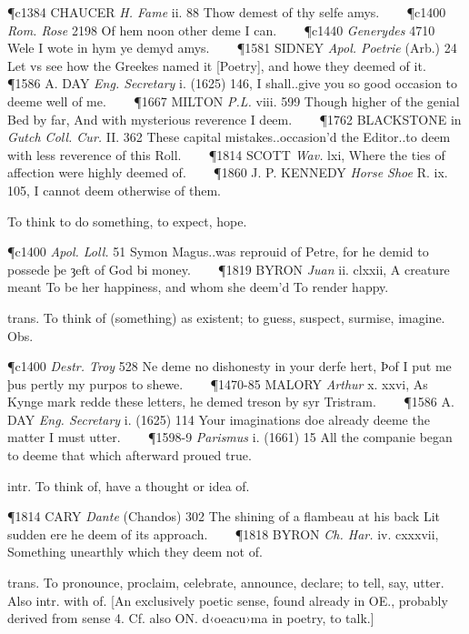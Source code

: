 \begin{description}[wide, labelwidth=!, labelindent=0pt]
\begin{myenumerate}
\P c1384 CHAUCER  \textit{H. Fame} ii. 88 Thow demest of thy selfe amys.    
\P c1400  \textit{Rom. Rose} 2198 Of hem noon other deme I can.    
\P c1440 \textit{Generydes}  4710 Wele I wote in hym ye demyd amys.    
\P 1581 SIDNEY  \textit{Apol. Poetrie} (Arb.) 24 Let vs see how the Greekes named it [Poetry], and howe they deemed of it.    
\P 1586 A. DAY  \textit{Eng. Secretary} i. (1625) 146, I shall..give you so good occasion to deeme well of me.    
\P 1667 MILTON  \textit{P.L.} viii. 599 Though higher of the genial Bed by far, And with mysterious reverence I deem.    
\P 1762 BLACKSTONE in  \textit{Gutch Coll. Cur.} II. 362 These capital mistakes..occasion'd the Editor..to deem with less reverence of this Roll.    
\P 1814 SCOTT  \textit{Wav.} lxi, Where the ties of affection were highly deemed of.    
\P 1860 J. P. KENNEDY  \textit{Horse Shoe} R. ix. 105, I cannot deem otherwise of them.

 To think to do something, to expect, hope.

\P c1400  \textit{Apol. Loll.} 51 Symon Magus..was reprouid of Petre, for he demid to possede þe ȝeft of God bi money.    
\P 1819 BYRON  \textit{Juan} ii. clxxii, A creature meant To be her happiness, and whom she deem'd To render happy.

 trans. To think of (something) as existent; to guess, suspect, surmise, imagine. Obs.

\P c1400  \textit{Destr. Troy} 528 Ne deme no dishonesty in your derfe hert, Þof I put me þus pertly my purpos to shewe.    
\P 1470-85 MALORY  \textit{Arthur} x. xxvi, As Kynge mark redde these letters, he demed treson by syr Tristram.    
\P 1586 A. DAY  \textit{Eng. Secretary} i. (1625) 114 Your imaginations doe already deeme the matter I must utter.    
\P 1598-9 \textit{Parismus}  i. (1661) 15 All the companie began to deeme that which afterward proued true.

 intr. To think of, have a thought or idea of.

\P 1814 CARY  \textit{Dante} (Chandos) 302 The shining of a flambeau at his back Lit sudden ere he deem of its approach.    
\P 1818 BYRON  \textit{Ch. Har.} iv. cxxxvii, Something unearthly which they deem not of.

 trans. To pronounce, proclaim, celebrate, announce, declare; to tell, say, utter. Also intr. with of. [An exclusively poetic sense, found already in OE., probably derived from sense 4. Cf. also ON. d‹oeacu›ma in poetry, to talk.]


\end{myenumerate}
\end{description}
